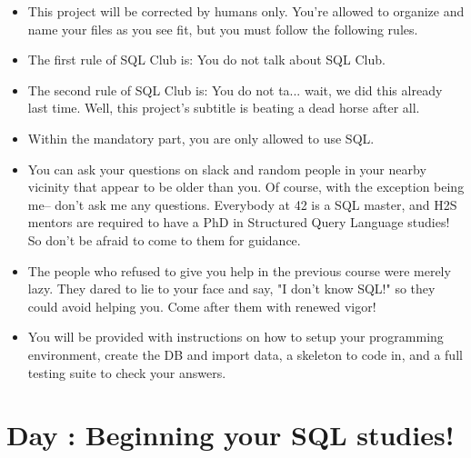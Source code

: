 \documentclass{42-en}
\begin{document}
	\begin{itemize}\itemsep1pt 
		\item This project will be corrected by humans only. 
			You're allowed to organize and name your files as you see 
			fit, but you must follow the following rules. 
		\item The first rule of SQL Club is: You do not talk about SQL Club.
		\item The second rule of SQL Club is: You do not ta... wait, we did this already last time. 
			Well, this project's subtitle is beating a dead horse after all. 
		\item Within the mandatory part, you are only allowed to use SQL. 
		\item You can ask your questions on slack and random people in your nearby vicinity 
			that appear to be older than you. Of course, with the exception being me-- don't ask me 
			any questions. Everybody at 42 is a SQL master, and H2S mentors are required 
			to have a PhD in Structured Query Language studies! So don't be afraid to 
			come to them for guidance.
		\item The people who refused to give you help in the previous course were merely lazy. They dared to lie to your 
			face and say, "I don't know SQL!" so they could avoid helping you. Come after them with renewed vigor! 
		\item You will be provided with instructions on how to setup your programming environment, create the DB 
			and import data, a skeleton to code in, and a full testing suite to check your answers.
	\end{itemize}

\startexercices


\chapter{Day \exercicenumber: Beginning your SQL studies! }

\makeheaderfiles
\end{document}
